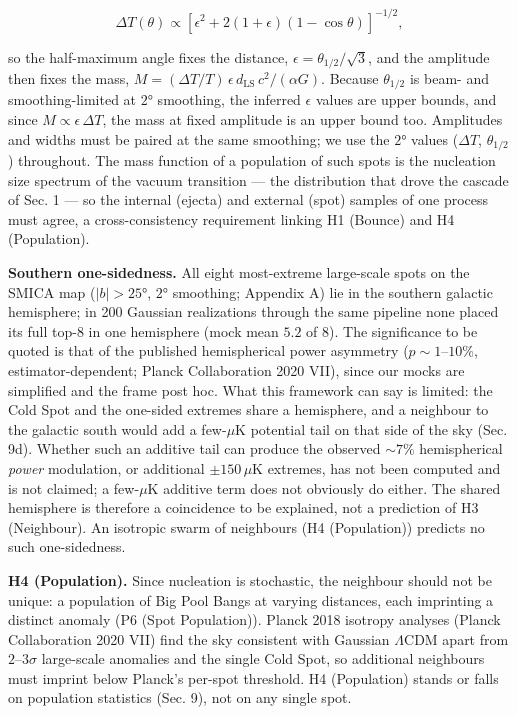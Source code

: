 \documentclass[
]{article}
\begin{document}
\[\Delta T(\theta) \propto \left[\epsilon^2 + 2(1+\epsilon)(1-\cos\theta)\right]^{-1/2},\]

so the half-maximum angle fixes the distance,
\(\epsilon = \theta_{1/2}/\sqrt{3}\), and the amplitude then fixes the
mass, \(M = (\Delta T/T)\,\epsilon\,d_{\text{LS}}\,c^2/(\alpha G)\).
Because \(\theta_{1/2}\) is beam- and smoothing-limited at \(2°\)
smoothing, the inferred \(\epsilon\) values are upper bounds, and since
\(M \propto \epsilon\,\Delta T\), the mass at fixed amplitude is an
upper bound too. Amplitudes and widths must be paired at the same
smoothing; we use the \(2°\) values (\(\Delta T\), \(\theta_{1/2}\))
throughout. The mass function of a population of such spots is the
nucleation size spectrum of the vacuum transition --- the distribution
that drove the cascade of Sec. 1 --- so the internal (ejecta) and
external (spot) samples of one process must agree, a cross-consistency
requirement linking H1 (Bounce) and H4 (Population).

\textbf{Southern one-sidedness.} All eight most-extreme large-scale
spots on the SMICA map (\(|b| > 25°\), \(2°\) smoothing; Appendix A) lie
in the southern galactic hemisphere; in 200 Gaussian realizations
through the same pipeline none placed its full top-8 in one hemisphere
(mock mean \(5.2\) of \(8\)). The significance to be quoted is that of
the published hemispherical power asymmetry (\(p \sim 1\)--\(10\%\),
estimator-dependent; Planck Collaboration 2020 VII), since our mocks are
simplified and the frame post hoc. What this framework can say is
limited: the Cold Spot and the one-sided extremes share a hemisphere,
and a neighbour to the galactic south would add a few-\(\mu\)K potential
tail on that side of the sky (Sec. 9d). Whether such an additive tail
can produce the observed \(\sim\!7\%\) hemispherical \emph{power}
modulation, or additional \(\pm 150\,\mu\)K extremes, has not been
computed and is not claimed; a few-\(\mu\)K additive term does not
obviously do either. The shared hemisphere is therefore a coincidence to
be explained, not a prediction of H3 (Neighbour). An isotropic swarm of
neighbours (H4 (Population)) predicts no such one-sidedness.

\textbf{H4 (Population).} Since nucleation is stochastic, the neighbour
should not be unique: a population of Big Pool Bangs at varying
distances, each imprinting a distinct anomaly (P6 (Spot Population)).
Planck 2018 isotropy analyses (Planck Collaboration 2020 VII) find the
sky consistent with Gaussian \(\Lambda\)CDM apart from
\(2\)--\(3\sigma\) large-scale anomalies and the single Cold Spot, so
additional neighbours must imprint below Planck's per-spot threshold. H4
(Population) stands or falls on population statistics (Sec. 9), not on
any single spot.
\end{document}
